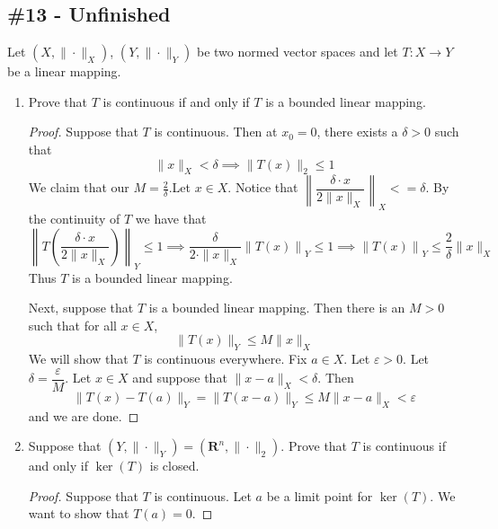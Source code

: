 \documentclass{article}
\newcommand{\R}{\mathbf{R}}
\theoremstyle{plain} %
\numberwithin{thm}{section} %
\theoremstyle{definition}
\begin{document}
        \subsection{\#13 - Unfinished}

        Let $(X,\|\cdot\|_X)$, $(Y,\|\cdot\|_Y)$ be two normed vector spaces and let $T:X\rightarrow Y$ be a linear mapping. %
        \begin{enumerate}[label=(\alph*)]
            \item Prove that $T$ is continuous if and only if $T$ is a bounded linear mapping.
            
            \begin{proof}
                Suppose that \(T\) is continuous. Then at \(x_0 = 0\), there exists a \(\delta >0\) such that
                \[
                    \|x\| _X < \delta \implies \|T(x)\| _2 \leq 1
                \]
                We claim that our \(M = \frac{2}{\delta}\).Let \(x \in X\). Notice that \(\left\lVert\dfrac{\delta \cdot x}{2\|x\| _X}\right\rVert _X <= \delta\). By the continuity of \(T\) we have that
                \[
                    \left\lVert T\left(\dfrac{\delta \cdot x}{2\|x\| _X} \right)\right\rVert _Y \leq 1 \implies \dfrac{\delta}{2\cdot \|x\| _X}\left\lVert T\left(x\right) \right\rVert _Y \leq 1 \implies \left\lVert T\left(x\right) \right\rVert _Y\leq \dfrac{2}{\delta}\|x\| _X
                \]
                Thus \(T\) is a bounded linear mapping.

                Next, suppose that \(T\) is a bounded linear mapping. Then there is an \(M > 0\) such that for all \(x \in X\),
                \[
                    \|T(x)\|_Y \leq M\|x\| _X
                \]
                We will show that \(T\) is continuous everywhere. Fix \(a \in X\). Let \(\varepsilon > 0\). Let \(\delta = \dfrac{\varepsilon}{M}\). Let \(x \in X\) and suppose that \(\|x - a\| _X < \delta\). Then
                \[
                    \|T(x) - T(a)\| _Y = \|T(x-a)\| _Y \leq M\|x-a\| _X < \varepsilon
                \]
                and we are done. 
            \end{proof}
            
            \item Suppose that $(Y,\|\cdot\|_Y)=(\R^n,\|\cdot\|_2)$. Prove that $T$ is continuous if and only if $\ker(T)$ is closed.
            \begin{proof}
                Suppose that \(T\) is continuous. Let \(a\) be a limit point for \(\ker (T)\). We want to show that \(T(a)=0\). 
                

\end{proof}
\end{enumerate}
\end{document}
